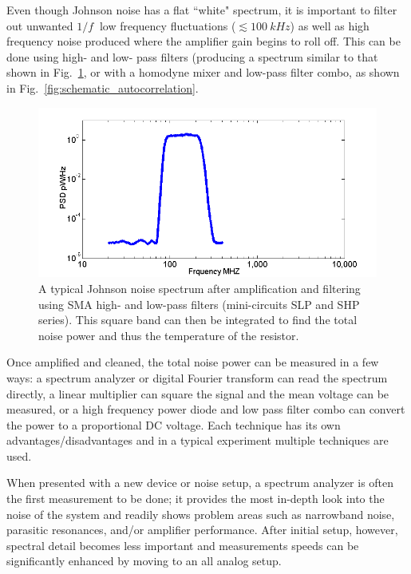Even though Johnson noise has a flat ``white" spectrum, it is important to filter out unwanted $1/f~$ low frequency fluctuations ($\lesssim 100~kHz$) as well as high frequency noise produced where the amplifier gain begins to roll off. 
This can be done using high- and low- pass filters (producing a spectrum similar to that shown in Fig.~\ref{fig:Miteq_BP_spec}, or with a homodyne mixer and low-pass filter combo, as shown in Fig.~\ref{fig:schematic_autocorrelation}. 
\begin{figure}
\includegraphics[width=\textwidth]{figures/Johnson_noise_thermometry/Miteq_BP_spec.png}
\caption{A typical Johnson noise spectrum after amplification and filtering using SMA high- and low-pass filters (mini-circuits SLP and SHP series). This square band can then be integrated to find the total noise power and thus the temperature of the resistor.}
\label{fig:Miteq_BP_spec}
\end{figure}

Once amplified and cleaned, the total noise power can be measured in a few ways: a spectrum analyzer or digital Fourier transform can read the spectrum directly, a linear multiplier can square the signal and the mean voltage can be measured, or a high frequency power diode and low pass filter combo can convert the power to a proportional DC voltage. Each technique has its own advantages/disadvantages and in a typical experiment multiple techniques are used. 

When presented with a new device or noise setup, a spectrum analyzer is often the first measurement to be done; it provides the most in-depth look into the noise of the system and readily shows problem areas such as narrowband noise, parasitic resonances, and/or amplifier performance. After initial setup, however, spectral detail becomes less important and measurements speeds can be significantly enhanced by moving to an all analog setup. 

